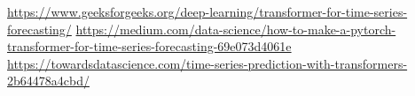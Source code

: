 \url{https://www.geeksforgeeks.org/deep-learning/transformer-for-time-series-forecasting/}
\url{https://medium.com/data-science/how-to-make-a-pytorch-transformer-for-time-series-forecasting-69e073d4061e}
\url{https://towardsdatascience.com/time-series-prediction-with-transformers-2b64478a4cbd/}
